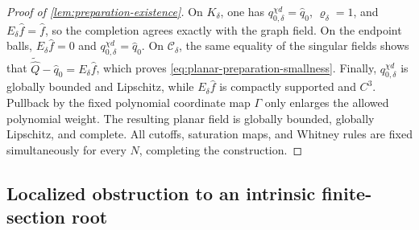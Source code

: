 \begin{proof}[Proof of \cref{lem:preparation-existence}]
On \(K_\delta\), one has
\(q_{0,\delta}^{\chi d}=\widehat q_0\),
\(\varrho_\delta=1\), and \(E_\delta\widehat f=\widehat f\), so the
completion agrees exactly with the graph field.  On the endpoint balls,
\(E_\delta\widehat f=0\) and
\(q_{0,\delta}^{\chi d}=\widehat q_0\).  On
\(\mathcal C_\delta\), the same equality of the singular fields shows that
\(\widetilde{\widehat Q}-\widehat q_0=E_\delta\widehat f\), which proves
\cref{eq:planar-preparation-smallness}.  Finally,
\(q_{0,\delta}^{\chi d}\) is globally bounded and Lipschitz, while
\(E_\delta\widehat f\) is compactly supported and \(C^3\).
Pullback by the fixed polynomial coordinate map \(\Gamma\) only enlarges
the allowed polynomial weight.  The resulting planar field is globally
bounded, globally Lipschitz, and complete.  All cutoffs, saturation maps,
and Whitney rules are fixed simultaneously for every \(N\), completing the
construction.
\end{proof}

\subsection{Localized obstruction to an intrinsic finite-section root}
\label{subsec:supplementary-root-noncanonicity}

